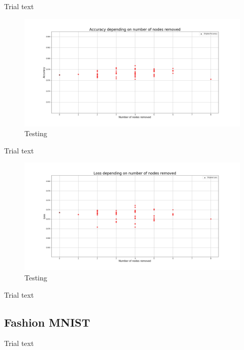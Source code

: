 \documentclass[UKenglish]{ifimaster}
\begin{document}
            Trial text

            \begin{figure}[h!]\centering
                \includegraphics[width=\textwidth]{Accuracy_vs_nodes_removed_mnist.png}
                \caption[Short title]{Testing}
                \label{fig:acc_rn_imp_mnist}
            \end{figure}

            Trial text

            \begin{figure}[h!]\centering
                \includegraphics[width=\textwidth]{Loss_vs_nodes_removed_mnist.png}
                \caption[Short title]{Testing}
                \label{fig:loss_rn_imp_mnist}
            \end{figure}

            Trial text

        \subsection{Fashion MNIST}

            Trial text
\end{document}
